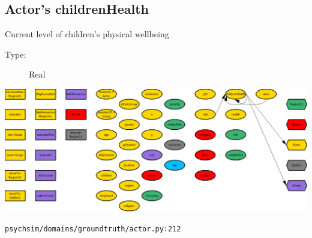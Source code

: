 \documentclass{article}%
\begin{document}
%
\subsection{Actor's childrenHealth}%
\label{subsec:Actor's childrenHealth}%
Current level of children's physical wellbeing%
\begin{description}%
\item[Type:]%
Real%
\end{description}%
\includegraphics[width=\textwidth]{images/childrenHealthOfActor.png}%
\begin{flushleft}%
\verb|psychsim/domains/groundtruth/actor.py:212|%
\end{flushleft}%
\end{document}

